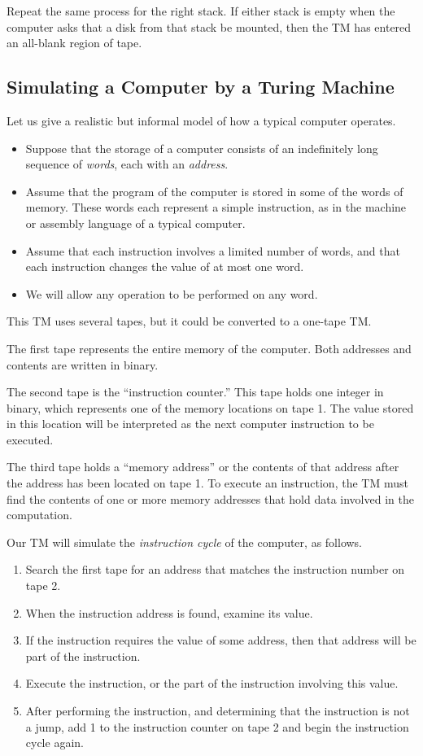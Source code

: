 \documentclass[]{article}
\begin{document}
Repeat the same process for the right stack. If either stack is empty when the
computer asks that a disk from that stack be mounted, then the TM has entered an
all-blank region of tape.

\subsection*{Simulating a Computer by a Turing Machine}
Let us give a realistic but informal model of how a typical computer operates.
\begin{itemize}
\item Suppose that the storage of a computer consists of an indefinitely long
sequence of \emph{words}, each with an \emph{address}.
\item Assume that the program of the computer is stored in some of the words of
memory. These words each represent a simple instruction, as in the machine or
assembly language of a typical computer.
\item Assume that each instruction involves a limited number of words, and that
each instruction changes the value of at most one word.
\item We will allow any operation to be performed on any word.
\end{itemize}

This TM uses several tapes, but it could be converted to a one-tape TM.

The first tape represents the entire memory of the computer. Both addresses and
contents are written in binary.

The second tape is the ``instruction counter.'' This tape holds one integer in
binary, which represents one of the memory locations on tape 1. The value stored
in this location will be interpreted as the next computer instruction to be
executed.

The third tape holds a ``memory address'' or the contents of that address after
the address has been located on tape 1. To execute an instruction, the TM must
find the contents of one or more memory addresses that hold data involved in the
computation.

Our TM will simulate the \emph{instruction cycle} of the computer, as follows.
\begin{enumerate}
\item Search the first tape for an address that matches the instruction number
on tape 2.
\item When the instruction address is found, examine its value.
\item If the instruction requires the value of some address, then that address
will be part of the instruction.
\item Execute the instruction, or the part of the instruction involving this
value.
\item After performing the instruction, and determining that the instruction is
not a jump, add 1 to the instruction counter on tape 2 and begin the instruction
cycle again.
\end{enumerate}
\end{document}
